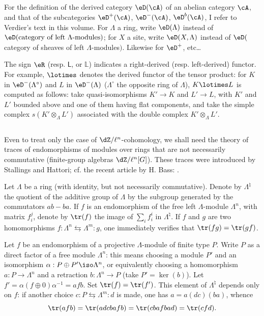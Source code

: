 \subsection{}\label{II:4-1}

For the definition of the derived category $\eD(\cA)$ of an abelian category
$\cA$, and that of the subcategories $\eD^+(\cA)$, $\eD^-(\cA)$,
$\eD^b(\cA)$, I refer to Verdier's text in this volume. For $\Lambda$ a ring,
write $\eD(\Lambda)$ instead of
$\eD(\text{category of left $\Lambda$-modules})$; for $X$ a site, write
$\eD(X,\Lambda)$ instead of
$\eD($category of sheaves of left $\Lambda$-modules$)$. Likewise for
$\eD^+$, etc\ldots

The sign $\eR$ (resp. $\mathsf{L}$, or $\mathbb{L}$) indicates a right-derived (resp.
left-derived) functor. For example, $\lotimes$ denotes the derived functor of
the tensor product: for $K$ in $\eD^-(\Lambda^\circ)$ and $L$ in
$\eD^-(\Lambda)$ ($\Lambda^\circ$ the opposite ring of $\Lambda$),
$K\lotimes L$ is computed as follows: take quasi-isomorphisms $K'\to K$ and
$L'\to L$, with $K'$ and $L'$ bounded above and one of them having flat
components, and take the simple complex $s(K'\otimes_\Lambda L')$ associated
with the double complex $K'\otimes_\Lambda L'$.






\subsection{}\label{II:4-2}

Even to treat only the case of $\dZ/\ell^n$-cohomology, we shall need the
theory of traces of endomorphisms of modules over rings that are not
necessarily commutative (finite-group algebras $\dZ/\ell^n[G]$). These
traces were introduced by Stallings and Hattori; cf. the recent article by H. Bass: \cite{ba76}.

Let $\Lambda$ be a ring (with identity, but not necessarily commutative).
Denote by $\Lambda^\natural$ the quotient of the additive group of $\Lambda$
by the subgroup generated by the commutators $a b-b a$. If $f$ is an
endomorphism of the free left $\Lambda$-module $\Lambda^n$, with matrix
$f_i^j$, denote by $\tr(f)$ the image of $\sum_i f_i^i$ in
$\Lambda^\natural$. If $f$ and $g$ are two homomorphisms
$f:\Lambda^n \leftrightarrows \Lambda^m : g$, one immediately verifies that
$\tr(f g) = \tr(g f)$.

Let $f$ be an endomorphism of a projective $\Lambda$-module of finite type
$P$. Write $P$ as a direct factor of a free module $\Lambda^n$: this means
choosing a module $P'$ and an isomorphism
$\alpha:P\oplus P'\iso \Lambda^n$, or equivalently choosing a homomorphism
$a:P\to \Lambda^n$ and a retraction $b:\Lambda^n\to P$ (take
$P'=\ker(b)$). Let $f'=\alpha(f\oplus 0)\alpha^{-1} =af b$. Set
$\tr(f) = \tr(f')$. This element of $\Lambda^\natural$ depends only on $f$:
if another choice $c:P\leftrightarrows \Lambda^m:d$ is made, one has
$a=a(dc)(ba)$, whence
\[
 \tr(a f b) = \tr(adcbafb) = \tr(cbafbad) = \tr(cfd) \text{.}
\]

